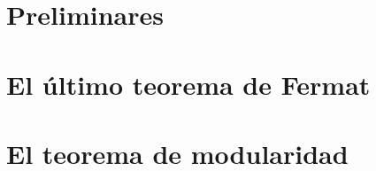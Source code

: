 \documentclass[12pt]{report}
\begin{document}
\tableofcontents
\newpage



\chapter{Preliminares}
	
	
	
	
	
\chapter{El \'ultimo teorema de Fermat}
	
	
	
	

\chapter{El teorema de modularidad}
	
	
	
	



\appendix


{}

\end{document}
